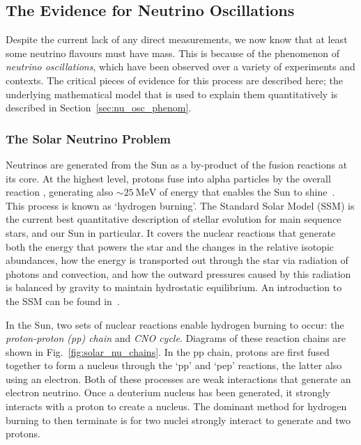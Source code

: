 \subsection{The Evidence for Neutrino Oscillations}\label{sec:nu_osc_evidence}
Despite the current lack of any direct measurements, we now know that at least some neutrino flavours must have mass. This is because of the phenomenon of \textit{neutrino oscillations}, which have been observed over a variety of experiments and contexts. The critical pieces of evidence for this process are described here; the underlying mathematical model that is used to explain them quantitatively is described in Section~\ref{sec:nu_osc_phenom}.

\subsubsection{The Solar Neutrino Problem}
Neutrinos are generated from the Sun as a by-product of the fusion reactions at its core. At the highest level, protons fuse into alpha particles by the overall reaction , generating also $\sim\SI{25}{\MeV}$ of energy that enables the Sun to shine~\cite{bahcallNeutrinoAstrophysics1989}. %
This process is known as `hydrogen burning'. The Standard Solar Model (SSM) is the current best quantitative description of stellar evolution for main sequence stars, and our Sun in particular. It covers the nuclear reactions that generate both the energy that powers the star and the changes in the relative isotopic abundances, how the energy is transported out through the star via radiation of photons and convection, and how the outward pressures caused by this radiation is balanced by gravity to maintain hydrostatic equilibrium. An introduction to the SSM can be found in~\cite{bahcallNeutrinoAstrophysics1989}. %

In the Sun, two sets of nuclear reactions enable hydrogen burning to occur: the \textit{proton-proton (pp) chain} and \textit{CNO cycle}. Diagrams of these reaction chains are shown in Fig.~\ref{fig:solar_nu_chains}. In the pp chain, protons are first fused together to form a  nucleus through the `pp' and `pep' reactions, the latter also using an electron. Both of these processes are weak interactions that generate an electron neutrino. Once a deuterium nucleus has been generated, it strongly interacts with a proton to create a  nucleus. The dominant method for hydrogen burning to then terminate is for two  nuclei strongly interact to generate  and two protons.

